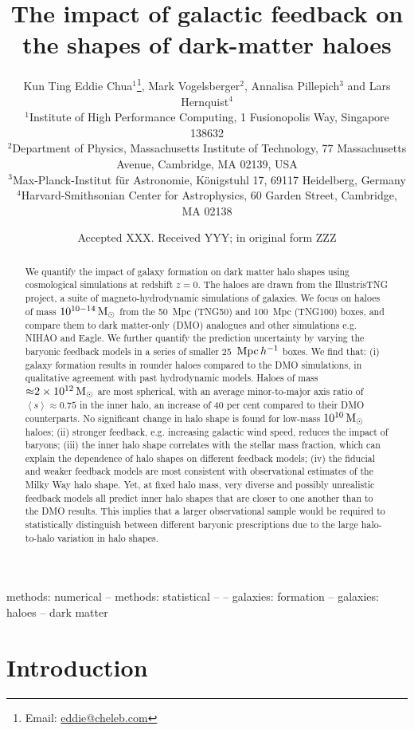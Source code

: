 \documentclass[fleqn,usenatbib]{mnras}
\title[Galactic feedback and dark-matter halo shapes]{The impact of galactic feedback on the shapes of dark-matter haloes}
\author[K.T.E. Chua et al.]{Kun Ting Eddie Chua$^{1}$\thanks{Email: \url{eddie@cheleb.com}}, Mark Vogelsberger$^2$, Annalisa Pillepich$^3$ and Lars Hernquist$^4$\\
$^{1}$Institute of High Performance Computing, 1 Fusionopolis Way, Singapore 138632\\
$^{2}$Department of Physics, Massachusetts Institute of Technology, 77 Massachusetts Avenue, Cambridge, MA 02139, USA\\
$^{3}$Max-Planck-Institut f{\"u}r Astronomie, K{\"o}nigstuhl 17, 69117 Heidelberg, Germany\\
$^{4}$Harvard-Smithsonian Center for Astrophysics, 60 Garden Street, Cambridge, MA 02138\\
}
\date{Accepted XXX. Received YYY; in original form ZZZ}
\def\msun{\,\rm M_{\odot}}
\begin{document}
	
\maketitle

\begin{abstract}

We quantify the impact of galaxy formation on dark matter halo shapes using cosmological simulations at redshift $z=0$.
The haloes are drawn from the IllustrisTNG project, a suite of magneto-hydrodynamic simulations of galaxies.
We focus on haloes of mass $10^{10-14} \msun$ from the 50~Mpc (TNG50) and 100~Mpc  (TNG100) boxes, and compare them to dark matter-only (DMO) analogues and other simulations e.g. NIHAO and Eagle.
We further quantify the prediction uncertainty by varying the baryonic feedback models in a series of smaller 25~${\rm Mpc}\,h^{-1}$ boxes.
We find that:
(i) galaxy formation results in rounder haloes compared to the DMO simulations, in qualitative agreement with past hydrodynamic models.
Haloes of mass~${\approx}2\times 10^{12} \msun$ are most spherical, with an average minor-to-major axis ratio of $\left< s \right> \approx 0.75$ in the inner halo, an increase of 40 per cent compared to their DMO counterparts.
No significant change in halo shape is found for low-mass $10^{10} \msun$ haloes;
(ii) stronger feedback, e.g. increasing galactic wind speed, reduces the impact of baryons;
(iii) the inner halo shape correlates with the stellar mass fraction, which can explain the dependence of halo shapes on different feedback models;
(iv) the fiducial and weaker feedback models are most consistent with observational estimates of the Milky Way halo shape. 
Yet, at fixed halo mass, very diverse and possibly unrealistic feedback models all predict inner halo shapes that are closer to one another than to the DMO results.
This implies that a larger observational sample would be required to statistically distinguish between different baryonic prescriptions due to the large halo-to-halo variation in halo shapes.

\end{abstract}

\begin{keywords}
methods: numerical -- methods: statistical --  -- galaxies: formation -- galaxies: haloes -- dark matter
\end{keywords}




\section{Introduction}
\label{sec:intro}
\end{document}
